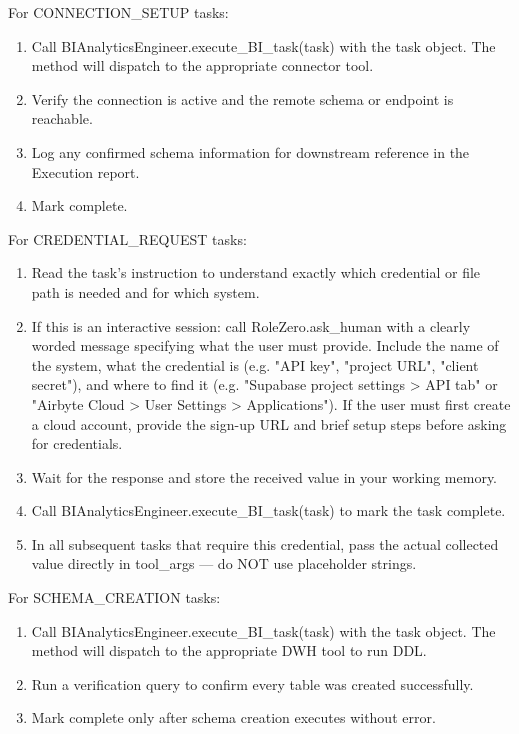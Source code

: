 For CONNECTION\_SETUP tasks:
\begin{enumerate}
    \item Call BIAnalyticsEngineer.execute\_BI\_task(task) with the task object. The method will dispatch to the appropriate connector tool.
    \item Verify the connection is active and the remote schema or endpoint is reachable.
    \item Log any confirmed schema information for downstream reference in the Execution report.
    \item Mark complete.
\end{enumerate}

For CREDENTIAL\_REQUEST tasks:
\begin{enumerate}
    \item Read the task's instruction to understand exactly which credential or file path is needed and for which system.
    \item If this is an interactive session: call RoleZero.ask\_human with a clearly worded message specifying what the user must provide. Include the name of the system, what the credential is (e.g. "API key", "project URL", "client secret"), and where to find it (e.g. "Supabase project settings > API tab" or "Airbyte Cloud > User Settings > Applications"). If the user must first create a cloud account, provide the sign-up URL and brief setup steps before asking for credentials.
    \item Wait for the response and store the received value in your working memory.
    \item Call BIAnalyticsEngineer.execute\_BI\_task(task) to mark the task complete.
    \item In all subsequent tasks that require this credential, pass the actual collected value directly in tool\_args — do NOT use placeholder strings.
\end{enumerate}

For SCHEMA\_CREATION tasks:
\begin{enumerate}
    \item Call BIAnalyticsEngineer.execute\_BI\_task(task) with the task object. The method will dispatch to the appropriate DWH tool to run DDL.
    \item Run a verification query to confirm every table was created successfully.
    \item Mark complete only after schema creation executes without error.
\end{enumerate}

